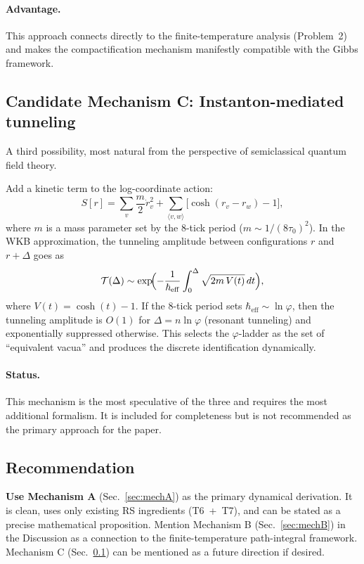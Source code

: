 \documentclass[11pt]{article}
\theoremstyle{definition}
\newcommand{\phig}{\varphi}
\begin{document}
\paragraph{Advantage.} This approach connects directly to the finite-temperature analysis (Problem~2) and makes the compactification mechanism manifestly compatible with the Gibbs framework.

\subsection{Candidate Mechanism C: Instanton-mediated tunneling}
\label{sec:mechC}

A third possibility, most natural from the perspective of semiclassical quantum field theory.

Add a kinetic term to the log-coordinate action:
\begin{equation}
S[r] = \sum_v \frac{m}{2}\dot{r}_v^2 + \sum_{\langle v,w\rangle} \bigl[\cosh(r_v - r_w) - 1\bigr],
\end{equation}
where $m$ is a mass parameter set by the 8-tick period ($m \sim 1/(8\tau_0)^2$). In the WKB approximation, the tunneling amplitude between configurations $r$ and $r + \Delta$ goes as
\begin{equation}
\mathcal{T}(\Delta) \sim \exp\!\Bigl(-\frac{1}{\hbar_{\mathrm{eff}}} \int_0^\Delta \sqrt{2m\,V(t)}\,dt\Bigr),
\end{equation}
where $V(t) = \cosh(t) - 1$. If the 8-tick period sets $\hbar_{\mathrm{eff}} \sim \ln\phig$, then the tunneling amplitude is $O(1)$ for $\Delta = n\ln\phig$ (resonant tunneling) and exponentially suppressed otherwise. This selects the $\phig$-ladder as the set of ``equivalent vacua'' and produces the discrete identification dynamically.

\paragraph{Status.} This mechanism is the most speculative of the three and requires the most additional formalism. It is included for completeness but is not recommended as the primary approach for the paper.

\subsection{Recommendation}

\textbf{Use Mechanism A} (Sec.~\ref{sec:mechA}) as the primary dynamical derivation. It is clean, uses only existing RS ingredients (T6~+~T7), and can be stated as a precise mathematical proposition. Mention Mechanism B (Sec.~\ref{sec:mechB}) in the Discussion as a connection to the finite-temperature path-integral framework. Mechanism C (Sec.~\ref{sec:mechC}) can be mentioned as a future direction if desired.
\end{document}
